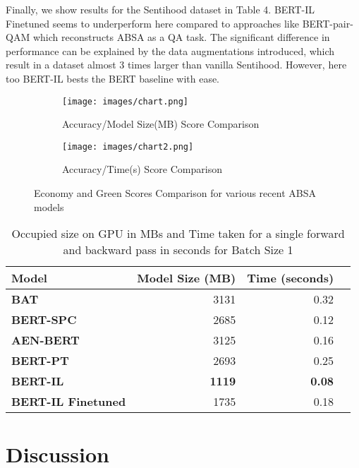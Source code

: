 \documentclass[11pt,a4paper]{article}
\begin{document}
Finally, we show results for the Sentihood dataset in Table 4. BERT-IL Finetuned seems to underperform here compared to approaches like BERT-pair-QAM \cite{sun2019utilizing} which reconstructs ABSA as a QA task. The significant difference in performance can be explained by the data augmentations introduced, which result in a dataset almost 3 times larger than vanilla Sentihood. However, here too BERT-IL bests the BERT baseline with ease.  
\begin{figure*}[h]

\begin{subfigure}{0.5\textwidth}
\texttt{[image: images/chart.png]} 
\caption{Accuracy/Model Size(MB) Score Comparison}
\label{fig:chart}
\end{subfigure}
\begin{subfigure}{0.5\textwidth}
\texttt{[image: images/chart2.png]}
\caption{Accuracy/Time(s) Score Comparison}
\label{fig:subim2}
\end{subfigure}

\caption{Economy and Green Scores Comparison for various recent ABSA models}
\label{fig:image2}
\end{figure*}

\begin{table*}[!htp]\centering
\begin{tabular}{lrrr}\toprule
\textbf{Model} &\textbf{Model Size (MB)} &\textbf{Time (seconds)} \\\midrule
\textbf{BAT} &{3131} &{0.32} \\
\textbf{BERT-SPC} &{2685} &{0.12} \\
\textbf{AEN-BERT} &{3125} &{0.16} \\
\textbf{BERT-PT} &{2693} &{0.25} \\
\textbf{BERT-IL} &\textbf{1119} &\textbf{0.08} \\
\textbf{BERT-IL Finetuned} &{1735} &{0.18} \\
\bottomrule
\end{tabular}
\caption{Occupied size on GPU in MBs and Time taken for a single forward and backward pass  in seconds for Batch Size 1}\label{tab: }

\end{table*}

\section{Discussion}
\end{document}
